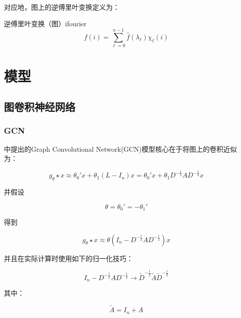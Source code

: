 \documentclass[color=gray,base=hide,cn]{elegantbook}
\begin{document}
对应地，图上的逆傅里叶变换定义为：

\begin{definition}{逆傅里叶变换（图）}{ifourier}
    \begin{equation}
        f(i) = \sum_{\ell=0}^{n-1} \hat{f}(\lambda_{\ell}) \chi_{\ell}(i)
    \end{equation}
\end{definition}

\part{模型}

\chapter{图卷积神经网络}


\section{GCN}
\cite{kipf2016semi}中提出的Graph Convolutional Network(GCN)模型核心在于将图上的卷积近似为：

\begin{equation}
    g_\theta \star x \approx \theta_0'x + \theta_1 (L-I_n)x =  \theta_0'x + \theta_1 D^{-\frac{1}{2}} A D^{-\frac{1}{2}} x
\end{equation}

并假设

\begin{equation}
    \theta = \theta_0' = -\theta_1'
    \label{eqn:theta}
\end{equation}

得到

\begin{equation}
    g_\theta \star x \approx \theta\left (I_n - D^{-\frac{1}{2}} A D^{-\frac{1}{2}} \right) x
\end{equation}

并且在实际计算时使用如下的归一化技巧：

\begin{equation}
    I_n - D^{-\frac{1}{2}} A D^{-\frac{1}{2}} \rightarrow \tilde{D}^{-\frac{1}{2}} \tilde{A} \tilde{D}^{-\frac{1}{2}}
\end{equation}

其中：

\begin{equation}
    \tilde{A} = I_n + A
\end{equation}
\end{document}
